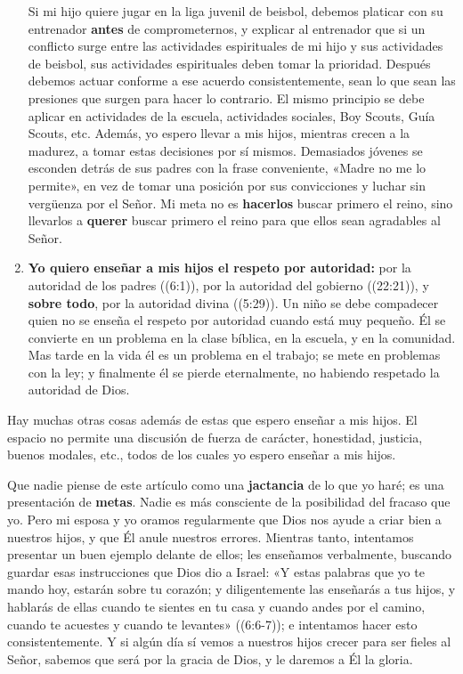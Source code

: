 \documentclass[12pt, twoside, openright]{book}
\begin{document}
\begin{enumerate}
Si mi hijo quiere jugar en la liga juvenil de beisbol, debemos platicar con su entrenador \textbf{antes} de comprometernos, y explicar al entrenador que si un conflicto surge entre las actividades espirituales de mi hijo y sus actividades de beisbol, sus actividades espirituales deben tomar la prioridad. Después debemos actuar conforme a ese acuerdo consistentemente, sean lo que sean las presiones que surgen para hacer lo contrario. El mismo principio se debe aplicar en actividades de la escuela, actividades sociales, Boy Scouts, Guía Scouts, etc. Además, yo espero llevar a mis hijos, mientras crecen a la madurez, a tomar estas decisiones por sí mismos. Demasiados jóvenes se esconden detrás de sus padres con la frase conveniente, «Madre no me lo permite», en vez de tomar una posición por sus convicciones y luchar sin vergüenza por el Señor. Mi meta no es \textbf{hacerlos} buscar primero el reino, sino llevarlos a \textbf{querer} buscar primero el reino para que ellos sean agradables al Señor. 
\item\textbf{Yo quiero enseñar a mis hijos el respeto por autoridad:} por la autoridad de los padres ((6:1)), por la autoridad del gobierno ((22:21)), y \textbf{sobre todo}, por la autoridad divina ((5:29)). Un niño se debe compadecer quien no se enseña el respeto por autoridad cuando está muy pequeño. Él se convierte en un problema en la clase bíblica, en la escuela, y en la comunidad. Mas tarde en la vida él es un problema en el trabajo; se mete en problemas con la ley; y finalmente él se pierde eternalmente, no habiendo respetado la autoridad de Dios.
\end{enumerate}
Hay muchas otras cosas además de estas que espero enseñar a mis hijos. El espacio no permite una discusión de fuerza de carácter, honestidad, justicia, buenos modales, etc., todos de los cuales yo espero enseñar a mis hijos.

Que nadie piense de este artículo como una \textbf{jactancia} de lo que yo haré; es una presentación de \textbf{metas}. Nadie es más consciente de la posibilidad del fracaso que yo. Pero mi esposa y yo oramos regularmente que Dios nos ayude a criar bien a nuestros hijos, y que Él anule nuestros errores. Mientras tanto, intentamos presentar un buen ejemplo delante de ellos; les enseñamos verbalmente, buscando guardar esas instrucciones que Dios dio a Israel: «Y estas palabras que yo te mando hoy, estarán sobre tu corazón; y diligentemente las enseñarás a tus hijos, y hablarás de ellas cuando te sientes en tu casa y cuando andes por el camino, cuando te acuestes y cuando te levantes» ((6:6-7)); e intentamos hacer esto consistentemente. Y si algún día sí vemos a nuestros hijos crecer para ser fieles al Señor, sabemos que será por la gracia de Dios, y le daremos a Él la gloria.
\end{document}
